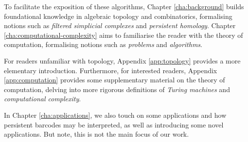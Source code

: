 To facilitate the exposition of these algorithms, Chapter \ref{cha:background} builds foundational knowledge in algebraic topology and combinatorics, formalising notions such as \emph{filtered simplicial complexes} and \emph{persistent homology}. Chapter \ref{cha:computational-complexity} aims to familiarise the reader with the theory of computation, formalising notions such as \emph{problems} and \emph{algorithms}. 

For readers unfamiliar with topology, Appendix \ref{app:topology} provides a more elementary introduction. Furthermore, for interested readers, Appendix \ref{app:computation} provides some supplementary material on the theory of computation, delving into more rigorous definitions of \emph{Turing machines} and \emph{computational complexity}.

In Chapter \ref{cha:applications}, we also touch on some applications and how persistent barcodes may be interpreted, as well as introducing some novel applications. But note, this is not the main focus of our work.


